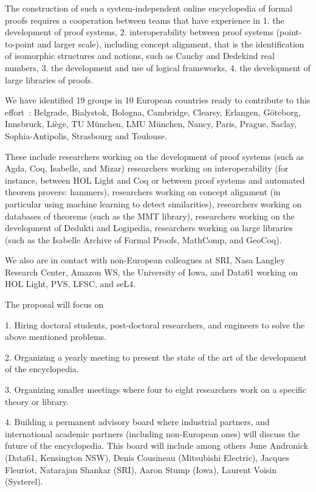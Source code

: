 The construction of such a system-independent online encyclopedia of formal proofs requires a cooperation between teams that have experience in
1. the development of proof systems,
2. interoperability between proof systems (point-to-point and larger scale), including concept alignment, that is the identification of isomorphic structures and notions, such as Cauchy and Dedekind real numbers,
3. the development and use of logical frameworks,
4. the development of large libraries of proofs.

We have identified 19 groups in 10 European countries ready to contribute to this effort : Belgrade, Bialystok, Bologna, Cambridge, Clearsy, Erlangen, G\"oteborg, Innsbruck, Liège, TU München, LMU München, Nancy, Paris, Prague, Saclay, Sophia-Antipolis, Strasbourg and Toulouse.

These include researchers working on the development of proof systems
(such as Agda, Coq, Isabelle, and Mizar) researchers working on
interoperability (for instance, between HOL Light and Coq or between
proof systems and automated theorem provers: hammers), researchers
working on concept alignment (in particular using machine learning to
detect similarities), researchers working on databases of theorems
(such as the MMT library), researchers working on the development of
Dedukti and Logipedia, researchers working on large libraries (such as
the Isabelle Archive of Formal Proofs, MathComp, and GeoCoq).


We also are in contact with non-European colleagues at SRI, Nasa
Langley Research Center, Amazon WS, the University of Iowa, and Data61
working on HOL Light, PVS, LFSC, and seL4.

The proposal will focus on

1. Hiring doctoral students, post-doctoral researchers, and engineers to solve the above mentioned problems.

2. Organizing a yearly meeting to present the state of the art of the development of the encyclopedia.

3. Organizing smaller meetings where four to eight researchers work on a specific theory or library.

4. Building a permanent advisory board where industrial partners, and
international academic partners (including non-European ones) will
discuss the future of the encyclopedia. This board will include among
others June Andronick (Data61, Kensington NSW), Denis Cousineau
(Mitsubishi Electric), Jacques Fleuriot, Natarajan Shankar (SRI),
Aaron Stump (Iowa), Laurent Voisin (Systerel).



